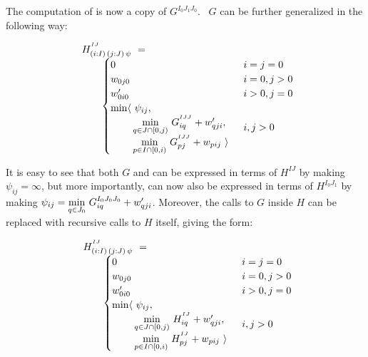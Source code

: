 The computation of  is now a copy of $G^{I_0J_1J_0}$. ~$G$ can be further generalized in the following
way:

\newcommand{\Ggen}{H}

\begin{equation}\LeftEqNo
\begin{array}{l@{}l}
	\Ggen^{^{IJ}}_{(i:I)\,(j:J)\,\psi} ~=~  \\
	\qquad
	\begin{cases}
		0                         & i=j=0 \\
		w_{0j0}                   & i=0, j>0 \\
		w'_{0i0}                  & i>0, j=0 \\
		\begin{array}{@{}l@{~}l}
		  \min\langle & \psi_{ij}, \\
		              & \!\underset{q\in J\cap[0,j)}\min ~ G^{^{IJJ}}_{iq} + \yw{qji}, \\
		              & \!\underset{p\in I\cap[0,i)}\min ~ G^{^{IJJ}}_{pj} + \xw{pij}~\rangle
		\end{array}              & i,j>0
	\end{cases}
\end{array}
\end{equation}

It is easy to see that both $G$ and  can be expressed in terms of $\Ggen^{IJ}$ by making $\psi_{ij}=\infty$, 
but more importantly,  can now also be expressed in terms of $\Ggen^{I_0J_1}$ by making 
$\psi_{ij} =  \underset{q\in J_0}\min ~ G^{I_0J_0J_0}_{iq} + w'_{qji}$.
Moreover, the calls to $G$ inside $\Ggen$ can be replaced with recursive calls to $\Ggen$ itself,
giving the form: 

\begin{equation}\LeftEqNo
\begin{array}{l@{}l}
	\Ggen^{^{IJ}}_{(i:I)\,(j:J)\,\psi} ~=~  \\
	\qquad
	\begin{cases}
		0                         & i=j=0 \\
		w_{0j0}                   & i=0, j>0 \\
		w'_{0i0}                  & i>0, j=0 \\
		\begin{array}{@{}l@{~}l}
		  \min\langle & \psi_{ij}, \\
		              & \!\underset{q\in J\cap[0,j)}\min ~ H^{^{IJ}}_{iq} + \yw{qji}, \\
		              & \!\underset{p\in I\cap[0,i)}\min ~ H^{^{IJ}}_{pj} + \xw{pij}~\rangle
		\end{array}              & i,j>0
	\end{cases}
\end{array}
\end{equation}

